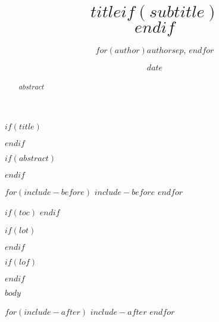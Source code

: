 \documentclass[11pt,a4paper]{article}
\title{$title$$if(subtitle)$\\\vspace{0.5em}{\large $subtitle$}$endif$}
\author{$for(author)$$author$$sep$, $endfor$}
\date{$date$}
\begin{document}
$if(title)$
  \maketitle
$endif$

$if(abstract)$
  \begin{abstract}
    $abstract$
  \end{abstract}
$endif$

$for(include-before)$
  $include-before$
$endfor$

$if(toc)$
{
  \hypersetup{linkcolor=black}
  \setcounter{tocdepth}{$toc-depth$}
  \tableofcontents
}
$endif$

$if(lot)$
  \listoftables
$endif$

$if(lof)$
  \listoffigures
$endif$

$body$

$for(include-after)$
  $include-after$
$endfor$
\end{document}
